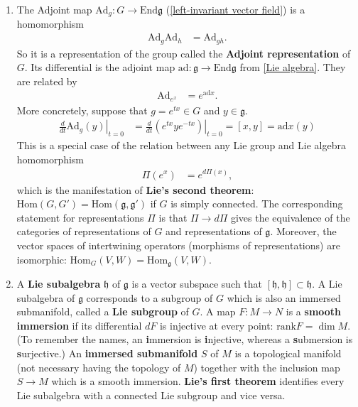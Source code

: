 \documentclass[aps,nofootinbib]{revtex4}
\begin{document}
\begin{enumerate}
\item \label{adjoint} The Adjoint map $\mbox{Ad}_{g}:G\to\mbox{End}\mathfrak{g}$ (\ref{left-invariant vector field}) is a homomorphism
\begin{align*}
\mbox{Ad}_{g}\mbox{Ad}_{h} & =\mbox{Ad}_{gh}.
\end{align*}
So it is a representation of the group called the \textbf{Adjoint
representation} of $G$. Its differential is the adjoint map $\mbox{ad}:\mathfrak{g}\to\mbox{End}\mathfrak{g}$
from \ref{Lie algebra}. They are related by
\begin{align*}
\mbox{Ad}_{e^{x}} & =e^{\mbox{ad}x}.
\end{align*}
More concretely, suppose that $g=e^{tx}\in G$ and $y\in\mathfrak{g}$.
\begin{align*}
\left.\frac{d}{dt}\mbox{Ad}_{g}\left(y\right)\right|_{t=0} & =\left.\frac{d}{dt}\left(e^{tx}ye^{-tx}\right)\right|_{t=0}=\left[x,y\right]=\mbox{ad}x\left(y\right)
\end{align*}
This is a special case of the relation between any Lie group and Lie
algebra homomorphism
\begin{align*}
\Pi\left(e^{x}\right) & =e^{d\Pi\left(x\right)},
\end{align*}
which is the manifestation of \textbf{Lie's second theorem}: $\mbox{Hom}\left(G,G'\right)=\mbox{Hom}\left(\mathfrak{g},\mathfrak{g}'\right)$
if $G$ is simply connected. The corresponding statement for representations
$\Pi$ is that $\Pi\to d\Pi$ gives the equivalence of the categories
of representations of $G$ and representations of $\mathfrak{g}$.
Moreover, the vector spaces of intertwining operators (morphisms of representations) are isomorphic:
$\mbox{Hom}_{G}\left(V,W\right)=\mbox{Hom}_{\mathfrak{g}}\left(V,W\right)$.


\item \label{Lie subgroup} A \textbf{Lie subalgebra} $\mathfrak{h}$ of $\mathfrak{g}$ is a vector subspace such that $\left[\mathfrak{h},\mathfrak{h}\right]\subset\mathfrak{h}$.
A Lie subalgebra of $\mathfrak{g}$ corresponds to a subgroup of $G$
which is also an immersed submanifold, called a \textbf{Lie subgroup
}of $G$. A map $F:M\to N$ is a \textbf{smooth immersion} if its
differential $dF$ is injective at every point: $\mbox{rank}F=\dim M$.
(To remember the names, an \textbf{i}mmersion is \textbf{i}njective,
whereas a \textbf{s}ubmersion is \textbf{s}urjective.) An \textbf{immersed
submanifold }$S$ of $M$ is a topological manifold (not necessary
having the topology of $M$) together with the inclusion map $S\to M$
which is a smooth immersion.\textbf{ Lie's first theorem }identifies
every Lie subalgebra with a connected Lie subgroup and vice versa.


\end{enumerate}
\end{document}
